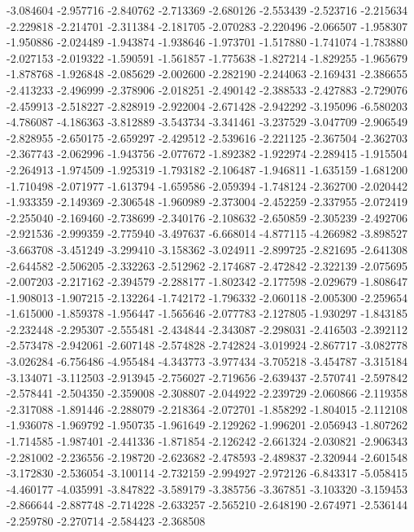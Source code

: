 -3.084604
-2.957716
-2.840762
-2.713369
-2.680126
-2.553439
-2.523716
-2.215634
-2.229818
-2.214701
-2.311384
-2.181705
-2.070283
-2.220496
-2.066507
-1.958307
-1.950886
-2.024489
-1.943874
-1.938646
-1.973701
-1.517880
-1.741074
-1.783880
-2.027153
-2.019322
-1.590591
-1.561857
-1.775638
-1.827214
-1.829255
-1.965679
-1.878768
-1.926848
-2.085629
-2.002600
-2.282190
-2.244063
-2.169431
-2.386655
-2.413233
-2.496999
-2.378906
-2.018251
-2.490142
-2.388533
-2.427883
-2.729076
-2.459913
-2.518227
-2.828919
-2.922004
-2.671428
-2.942292
-3.195096
-6.580203
-4.786087
-4.186363
-3.812889
-3.543734
-3.341461
-3.237529
-3.047709
-2.906549
-2.828955
-2.650175
-2.659297
-2.429512
-2.539616
-2.221125
-2.367504
-2.362703
-2.367743
-2.062996
-1.943756
-2.077672
-1.892382
-1.922974
-2.289415
-1.915504
-2.264913
-1.974509
-1.925319
-1.793182
-2.106487
-1.946811
-1.635159
-1.681200
-1.710498
-2.071977
-1.613794
-1.659586
-2.059394
-1.748124
-2.362700
-2.020442
-1.933359
-2.149369
-2.306548
-1.960989
-2.373004
-2.452259
-2.337955
-2.072419
-2.255040
-2.169460
-2.738699
-2.340176
-2.108632
-2.650859
-2.305239
-2.492706
-2.921536
-2.999359
-2.775940
-3.497637
-6.668014
-4.877115
-4.266982
-3.898527
-3.663708
-3.451249
-3.299410
-3.158362
-3.024911
-2.899725
-2.821695
-2.641308
-2.644582
-2.506205
-2.332263
-2.512962
-2.174687
-2.472842
-2.322139
-2.075695
-2.007203
-2.217162
-2.394579
-2.288177
-1.802342
-2.177598
-2.029679
-1.808647
-1.908013
-1.907215
-2.132264
-1.742172
-1.796332
-2.060118
-2.005300
-2.259654
-1.615000
-1.859378
-1.956447
-1.565646
-2.077783
-2.127805
-1.930297
-1.843185
-2.232448
-2.295307
-2.555481
-2.434844
-2.343087
-2.298031
-2.416503
-2.392112
-2.573478
-2.942061
-2.607148
-2.574828
-2.742824
-3.019924
-2.867717
-3.082778
-3.026284
-6.756486
-4.955484
-4.343773
-3.977434
-3.705218
-3.454787
-3.315184
-3.134071
-3.112503
-2.913945
-2.756027
-2.719656
-2.639437
-2.570741
-2.597842
-2.578441
-2.504350
-2.359008
-2.308807
-2.044922
-2.239729
-2.060866
-2.119358
-2.317088
-1.891446
-2.288079
-2.218364
-2.072701
-1.858292
-1.804015
-2.112108
-1.936078
-1.969792
-1.950735
-1.961649
-2.129262
-1.996201
-2.056943
-1.807262
-1.714585
-1.987401
-2.441336
-1.871854
-2.126242
-2.661324
-2.030821
-2.906343
-2.281002
-2.236556
-2.198720
-2.623682
-2.478593
-2.489837
-2.320944
-2.601548
-3.172830
-2.536054
-3.100114
-2.732159
-2.994927
-2.972126
-6.843317
-5.058415
-4.460177
-4.035991
-3.847822
-3.589179
-3.385756
-3.367851
-3.103320
-3.159453
-2.866644
-2.887748
-2.714228
-2.633257
-2.565210
-2.648190
-2.674971
-2.536144
-2.259780
-2.270714
-2.584423
-2.368508
